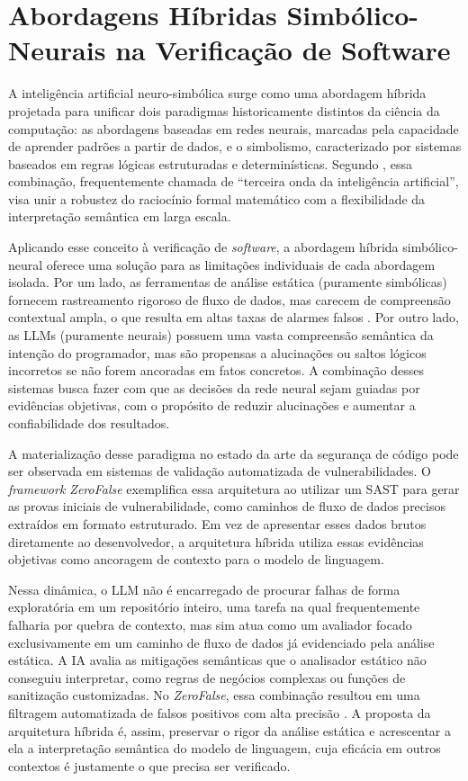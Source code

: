 \section{Abordagens Híbridas Simbólico-Neurais na Verificação de Software}
A inteligência artificial neuro-simbólica surge como uma abordagem híbrida projetada para unificar dois paradigmas historicamente distintos da ciência da computação: as abordagens baseadas em redes neurais, marcadas pela capacidade de aprender padrões a partir de dados, e o simbolismo, caracterizado por sistemas baseados em regras lógicas estruturadas e determinísticas. Segundo , essa combinação, frequentemente chamada de ``terceira onda da inteligência artificial'', visa unir a robustez do raciocínio formal matemático com a flexibilidade da interpretação semântica em larga escala.

Aplicando esse conceito à verificação de \textit{software}, a abordagem híbrida simbólico-neural oferece uma solução para as limitações individuais de cada abordagem isolada. Por um lado, as ferramentas de análise estática (puramente simbólicas) fornecem rastreamento rigoroso de fluxo de dados, mas carecem de compreensão contextual ampla, o que resulta em altas taxas de alarmes falsos \cite{muske2022survey}. Por outro lado, as LLMs (puramente neurais) possuem uma vasta compreensão semântica da intenção do programador, mas são propensas a alucinações ou saltos lógicos incorretos se não forem ancoradas em fatos concretos. A combinação desses sistemas busca fazer com que as decisões da rede neural sejam guiadas por evidências objetivas, com o propósito de reduzir alucinações e aumentar a confiabilidade dos resultados.

A materialização desse paradigma no estado da arte da segurança de código pode ser observada em sistemas de validação automatizada de vulnerabilidades. O \textit{framework ZeroFalse} \cite{iranmanesh2025zerofalseimprovingprecisionstatic} exemplifica essa arquitetura ao utilizar um SAST para gerar as provas iniciais de vulnerabilidade, como caminhos de fluxo de dados precisos extraídos em formato estruturado. Em vez de apresentar esses dados brutos diretamente ao desenvolvedor, a arquitetura híbrida utiliza essas evidências objetivas como ancoragem de contexto para o modelo de linguagem.

Nessa dinâmica, o LLM não é encarregado de procurar falhas de forma exploratória em um repositório inteiro, uma tarefa na qual frequentemente falharia por quebra de contexto, mas sim atua como um avaliador focado exclusivamente em um caminho de fluxo de dados já evidenciado pela análise estática. A IA avalia as mitigações semânticas que o analisador estático não conseguiu interpretar, como regras de negócios complexas ou funções de sanitização customizadas. No \textit{ZeroFalse}, essa combinação resultou em uma filtragem automatizada de falsos positivos com alta precisão \cite{iranmanesh2025zerofalseimprovingprecisionstatic}. A proposta da arquitetura híbrida é, assim, preservar o rigor da análise estática e acrescentar a ela a interpretação semântica do modelo de linguagem, cuja eficácia em outros contextos é justamente o que precisa ser verificado.

